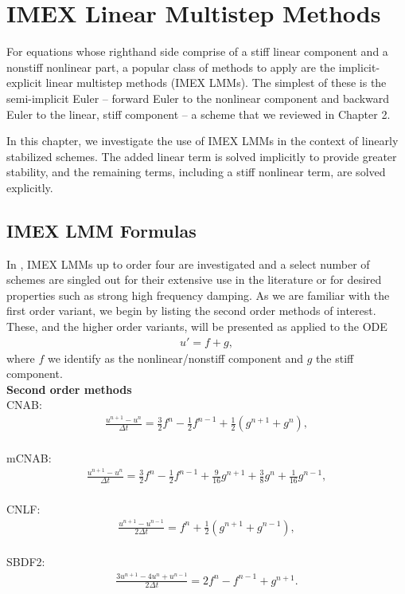 \chapter{IMEX Linear Multistep Methods}
For equations whose righthand side comprise of a stiff linear component and a nonstiff nonlinear part, a popular class of methods to apply are the implicit-explicit linear multistep methods (IMEX LMMs). The simplest of these is the semi-implicit Euler -- forward Euler to the nonlinear component and backward Euler to the linear, stiff component -- a scheme that we reviewed in Chapter 2. 

In this chapter, we investigate the use of IMEX LMMs in the context of linearly stabilized schemes. The added linear term is solved implicitly to provide greater stability, and the remaining terms, including a stiff nonlinear term, are solved explicitly.

\section{IMEX LMM Formulas}
In \cite{ascher1995implicit}, IMEX LMMs up to order four are investigated and a select number of schemes are singled out for their extensive use in the literature or for desired properties such as strong high frequency damping. As we are familiar with the first order variant, we begin by listing the second order methods of interest. These, and the higher order variants, will be presented as applied to the ODE 
\begin{align*}
u' = f + g, 
\end{align*}
where $f$ we identify as the nonlinear/nonstiff component and $g$ the stiff component. 
\\ \noindent
\textbf{Second order methods}\\
CNAB:
\begin{align}
\frac{u^{n+1}-u^n}{\Delta t} 
= \frac{3}{2} f^n - \frac{1}{2}f^{n-1} 
+ \frac{1}{2}(g^{n+1} + g^n), 
\label{cnab}
\end{align}\\
mCNAB:
\begin{align}
\frac{u^{n+1}-u^n}{\Delta t} 
= \frac{3}{2}f^n - \frac{1}{2} f^{n-1}
+ \frac{9}{16}g^{n+1} 
+ \frac{3}{8}g^n
+ \frac{1}{16}g^{n-1},
\label{mcnab}
\end{align}
\\
CNLF:
\begin{align}
\frac{u^{n+1}-u^{n-1}}{2\Delta t}
= f^n + \frac{1}{2}(g^{n+1} + g^{n-1}),
\label{cnlf}
\end{align} \\
SBDF2:
\begin{align}
\frac{3u^{n+1}-4u^n+u^{n-1}}{2\Delta t} 
= 2f^n - f^{n-1} + g^{n+1}.
\label{sbdf2}
\end{align}

